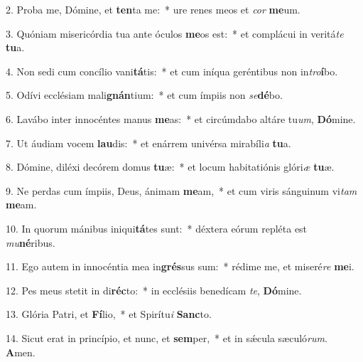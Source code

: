 2. Proba me, Dómine, et \textbf{ten}ta me:~*  ure renes meos et \textit{cor} \textbf{me}um.\

3. Quóniam misericórdia tua ante óculos \textbf{me}os est:~*  et complácui in veritá\textit{te} \textbf{tu}a.\

4. Non sedi cum concílio vani\textbf{tá}tis:~*  et cum iníqua geréntibus non in\textit{tro}\textbf{í}bo.\

5. Odívi ecclésiam mali\textbf{gnán}tium:~*  et cum ímpiis non \textit{se}\textbf{dé}bo.\

6. Lavábo inter innocéntes manus \textbf{me}as:~*  et circúmdabo altáre tu\textit{um}, \textbf{Dó}mine.\

7. Ut áudiam vocem \textbf{lau}dis:~*  et enárrem univérsa mirabíli\textit{a} \textbf{tu}a.\

8. Dómine, diléxi decórem domus \textbf{tu}æ:~*  et locum habitatiónis glóri\textit{æ} \textbf{tu}æ.\

9. Ne perdas cum ímpiis, Deus, ánimam \textbf{me}am,~*  et cum viris sánguinum vi\textit{tam} \textbf{me}am.\

10. In quorum mánibus iniqui\textbf{tá}tes sunt:~*  déxtera eórum repléta est \textit{mu}\textbf{né}ribus.\

11. Ego autem in innocéntia mea in\textbf{grés}sus sum:~*  rédime me, et miseré\textit{re} \textbf{me}i.\

12. Pes meus stetit in di\textbf{réc}to:~*  in ecclésiis benedícam \textit{te}, \textbf{Dó}mine.\

13. Glória Patri, et \textbf{Fí}lio,~*  et Spirítu\textit{i} \textbf{Sanc}to.\

14. Sicut erat in princípio, et nunc, et \textbf{sem}per,~*  et in sǽcula sæculó\textit{rum}. \textbf{A}men.\

